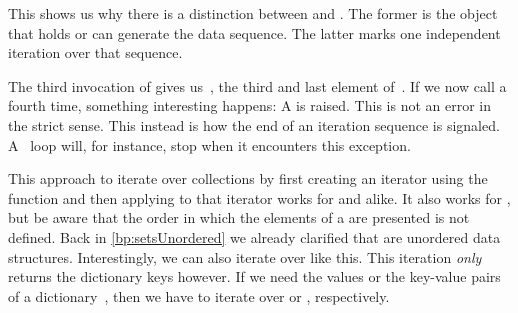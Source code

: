 This shows us why there is a distinction between  and .
The former is the object that holds or can generate the data sequence.
The latter marks one independent iteration over that sequence.

The third invocation of  gives us~, the third and last element of~.
If we now call  a fourth time, something interesting happens:
A  is raised.
This is not an error in the strict sense.
This instead is how the end of an iteration sequence is signaled.
A ~loop will, for instance, stop when it encounters this exception.

This approach to iterate over collections by first creating an iterator using the  function and then applying  to that iterator works for  and  alike.
It also works for , but be aware that the order in which the elements of a  are presented is not defined.
Back in \cref{bp:setsUnordered} we already clarified that  are unordered data structures.
Interestingly, we can also iterate over  like this.
This iteration \emph{only} returns the dictionary keys however.
If we need the values or the key-value pairs of a dictionary~, then we have to iterate over  or , respectively.

